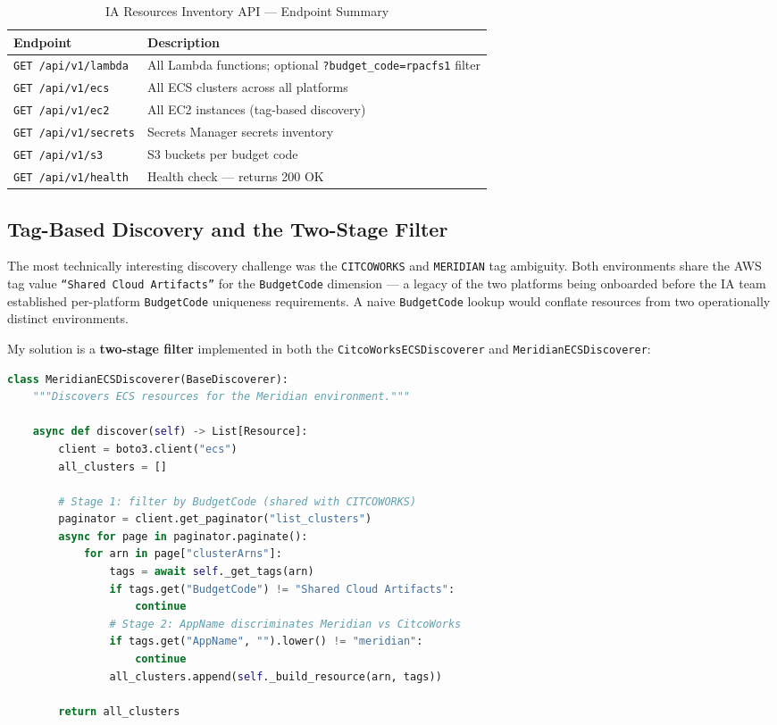 \begin{table}[ht]
\centering
\caption{IA Resources Inventory API --- Endpoint Summary}
\label{tab:api_endpoints}
\begin{tabular}{p{5.5cm}p{7.0cm}}
\toprule
\textbf{Endpoint} & \textbf{Description} \\
\midrule
\texttt{GET /api/v1/lambda} & All Lambda functions; optional
  \texttt{?budget\_code=rpacfs1} filter \\
\midrule
\texttt{GET /api/v1/ecs} & All ECS clusters across all platforms \\
\midrule
\texttt{GET /api/v1/ec2} & All EC2 instances (tag-based discovery) \\
\midrule
\texttt{GET /api/v1/secrets} & Secrets Manager secrets inventory \\
\midrule
\texttt{GET /api/v1/s3} & S3 buckets per budget code \\
\midrule
\texttt{GET /api/v1/health} & Health check --- returns 200 OK \\
\bottomrule
\end{tabular}
\end{table}

\subsection{Tag-Based Discovery and the Two-Stage Filter}

The most technically interesting discovery challenge was the
\texttt{CITCOWORKS} and \texttt{MERIDIAN} tag ambiguity. Both
environments share the AWS tag value \texttt{``Shared Cloud Artifacts''}
for the \texttt{BudgetCode} dimension --- a legacy of the two platforms
being onboarded before the IA team established per-platform
\texttt{BudgetCode} uniqueness requirements. A naive
\texttt{BudgetCode} lookup would conflate resources from two operationally
distinct environments.

My solution is a \textbf{two-stage filter} implemented in both the
\texttt{CitcoWorksECSDiscoverer} and \texttt{MeridianECSDiscoverer}:

\begin{lstlisting}[language=Python,
  caption={Two-Stage Filter --- Disambiguating Shared BudgetCode}]
class MeridianECSDiscoverer(BaseDiscoverer):
    """Discovers ECS resources for the Meridian environment."""

    async def discover(self) -> List[Resource]:
        client = boto3.client("ecs")
        all_clusters = []

        # Stage 1: filter by BudgetCode (shared with CITCOWORKS)
        paginator = client.get_paginator("list_clusters")
        async for page in paginator.paginate():
            for arn in page["clusterArns"]:
                tags = await self._get_tags(arn)
                if tags.get("BudgetCode") != "Shared Cloud Artifacts":
                    continue
                # Stage 2: AppName discriminates Meridian vs CitcoWorks
                if tags.get("AppName", "").lower() != "meridian":
                    continue
                all_clusters.append(self._build_resource(arn, tags))

        return all_clusters
\end{lstlisting}

